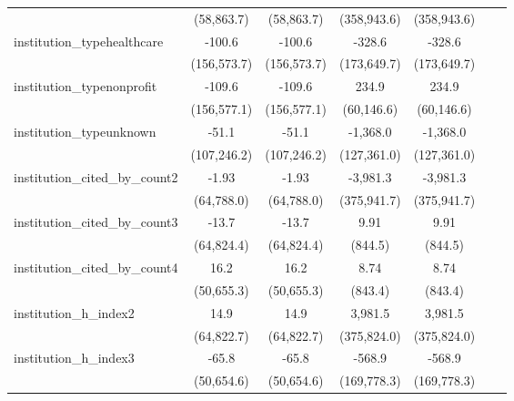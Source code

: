 \begin{tabular}{lcccccc}
                                         & (58,863.7)  & (58,863.7)  & (358,943.6) & (358,943.6) &       &   \\   
   institution\_typehealthcare           & -100.6      & -100.6      & -328.6      & -328.6      &       &   \\   
                                         & (156,573.7) & (156,573.7) & (173,649.7) & (173,649.7) &       &   \\   
   institution\_typenonprofit            & -109.6      & -109.6      & 234.9       & 234.9       &       &   \\   
                                         & (156,577.1) & (156,577.1) & (60,146.6)  & (60,146.6)  &       &   \\   
   institution\_typeunknown              & -51.1       & -51.1       & -1,368.0    & -1,368.0    &       &   \\   
                                         & (107,246.2) & (107,246.2) & (127,361.0) & (127,361.0) &       &   \\   
   institution\_cited\_by\_count2        & -1.93       & -1.93       & -3,981.3    & -3,981.3    &       &   \\   
                                         & (64,788.0)  & (64,788.0)  & (375,941.7) & (375,941.7) &       &   \\   
   institution\_cited\_by\_count3        & -13.7       & -13.7       & 9.91        & 9.91        &       &   \\   
                                         & (64,824.4)  & (64,824.4)  & (844.5)     & (844.5)     &       &   \\   
   institution\_cited\_by\_count4        & 16.2        & 16.2        & 8.74        & 8.74        &       &   \\   
                                         & (50,655.3)  & (50,655.3)  & (843.4)     & (843.4)     &       &   \\   
   institution\_h\_index2                & 14.9        & 14.9        & 3,981.5     & 3,981.5     &       &   \\   
                                         & (64,822.7)  & (64,822.7)  & (375,824.0) & (375,824.0) &       &   \\   
   institution\_h\_index3                & -65.8       & -65.8       & -568.9      & -568.9      &       &   \\   
                                         & (50,654.6)  & (50,654.6)  & (169,778.3) & (169,778.3) &       &   \\   

\end{tabular}

